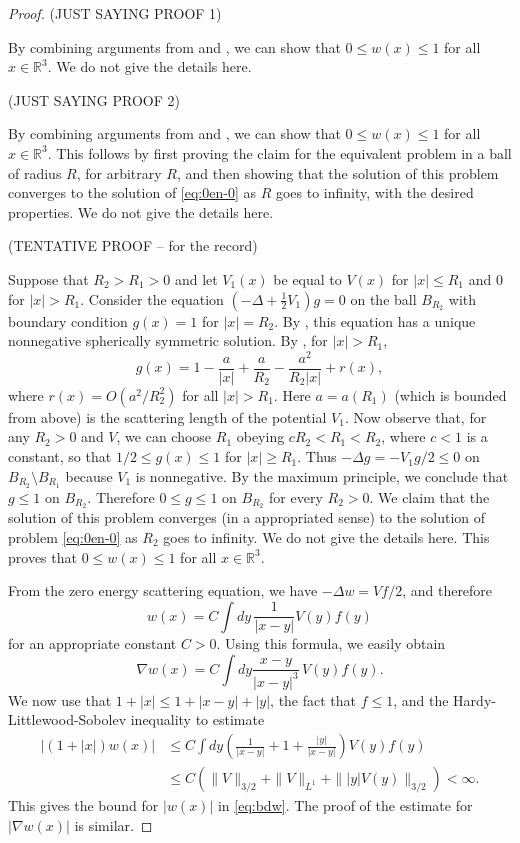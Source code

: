 \documentclass[11pt,a4paper]{article}
\newcommand{\R}{\mathbb{R}}
\begin{document}
\begin{proof}
  (JUST SAYING PROOF 1)

  By combining arguments from \cite[Appendix C]{LSSY} and \cite[Appendix
  D]{ESY2}, we can show that $0 \le w(x) \le 1$ for all $x \in \R^3$. We do
  not give the details here.

  (JUST SAYING PROOF 2)

  By combining arguments from \cite[Appendix C]{LSSY} and \cite[Appendix
  D]{ESY2}, we can show that $0 \le w(x) \le 1$ for all $x \in \R^3$. This
  follows by first proving the claim for the equivalent problem in a ball of
  radius $R$, for arbitrary $R$, and then showing that the solution of this
  problem converges to the solution of \eqref{eq:0en-0} as $R$ goes to
  infinity, with the desired properties. We do not give the details here.

  (TENTATIVE PROOF -- for the record)

  Suppose that $R_2 > R_1 > 0$ and let $V_1(x)$ be equal to $V(x)$ for $|x|
  \le R_1$ and $0$ for $|x| > R_1$. Consider the equation $(-\Delta +
  \frac{1}{2} V_1)g = 0$ on the ball $B_{R_2}$ with boundary condition
  $g(x)=1$ for $|x|=R_2$. By \cite[Theorem C.1]{LSSY}, this equation has a
  unique nonnegative spherically symmetric solution. By \cite[(C.7)]{LSSY},
  for $|x| > R_1$,
  \[
    g(x) = 1 - \frac{a}{|x|} + \frac{a}{R_2} - \frac{a^2}{R_2 |x|} + r(x),
  \]
  where $r(x) = O(a^2/R_2^2)$ for all $|x|>R_1$. Here $a=a(R_1)$ (which is
  bounded from above) is the scattering length of the potential $V_1$. Now
  observe that, for any $R_2 > 0$ and $V$, we can choose $R_1$ obeying $c
  R_2 < R_1 < R_2$, where $c < 1$ is a constant, so that $1/2 \le g(x) \le
  1$ for $|x| \geq R_1$. Thus $-\Delta g = -V_1 g/2 \le 0$ on $B_{R_2}
  \setminus B_{R_1}$ because $V_1$ is nonnegative. By the maximum principle,
  we conclude that $g \le 1$ on $B_{R_2}$. Therefore $0 \le g \le 1$ on
  $B_{R_2}$ for every $R_2 > 0$. We claim that the solution of this problem
  converges (in a appropriated sense) to the solution of problem
  \eqref{eq:0en-0} as $R_2$ goes to infinity. We do not give the details
  here. This proves that $0 \le w(x) \le 1$ for all $x \in \R^3$.
  
From the zero energy scattering equation, we have $-\Delta w = Vf /2$, and therefore
\[ w(x) = C \int dy \, \frac{1}{|x-y|} V (y) f (y) \]
for an appropriate constant $C>0$. Using this formula, we easily obtain
\[ \nabla w (x) = C \int dy \frac{x-y}{|x-y|^3} \, V (y) f (y). \]
We now use that $1+|x| \le 1 + |x-y| + |y|$, the fact that $f \le 1$, and
the Hardy-Littlewood-Sobolev inequality to estimate
\begin{align*}
  |(1+|x|)w(x)| & \le C \int dy \left( \frac{1}{|x-y|} + 1 +
\frac{|y|}{|x-y|} \right) V(y) f(y) \\
& \le C (\| V \|_{3/2} + \| V \|_{L^1} + \| |y| V(y) \|_{3/2} ) < \infty.
\end{align*}
This gives the bound for $|w(x)|$ in \eqref{eq:bdw}. The proof of the
estimate for $|\nabla w(x)|$ is similar.
\end{proof}
\end{document}
